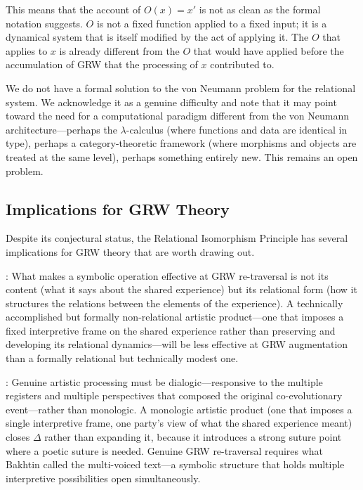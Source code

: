 This means that the account of $O(x) = x'$ is not as clean as the formal notation suggests. $O$ is not a fixed function applied to a fixed input; it is a dynamical system that is itself modified by the act of applying it. The $O$ that applies to $x$ is already different from the $O$ that would have applied before the accumulation of GRW that the processing of $x$ contributed to.

We do not have a formal solution to the von Neumann problem for the relational system. We acknowledge it as a genuine difficulty and note that it may point toward the need for a computational paradigm different from the von Neumann architecture---perhaps the $\lambda$-calculus (where functions and data are identical in type), perhaps a category-theoretic framework (where morphisms and objects are treated at the same level), perhaps something entirely new. This remains an open problem.

\subsection{Implications for GRW Theory}
\label{p15:subsec:implications}

\noindent
Despite its conjectural status, the Relational Isomorphism Principle has several implications for GRW theory that are worth drawing out.

: What makes a symbolic operation effective at GRW re-traversal is not its content (what it says about the shared experience) but its relational form (how it structures the relations between the elements of the experience). A technically accomplished but formally non-relational artistic product---one that imposes a fixed interpretive frame on the shared experience rather than preserving and developing its relational dynamics---will be less effective at GRW augmentation than a formally relational but technically modest one.

: Genuine artistic processing must be dialogic---responsive to the multiple registers and multiple perspectives that composed the original co-evolutionary event---rather than monologic. A monologic artistic product (one that imposes a single interpretive frame, one party's view of what the shared experience meant) closes $\Delta$ rather than expanding it, because it introduces a strong suture point where a poetic suture is needed. Genuine GRW re-traversal requires what Bakhtin called the multi-voiced text---a symbolic structure that holds multiple interpretive possibilities open simultaneously.

